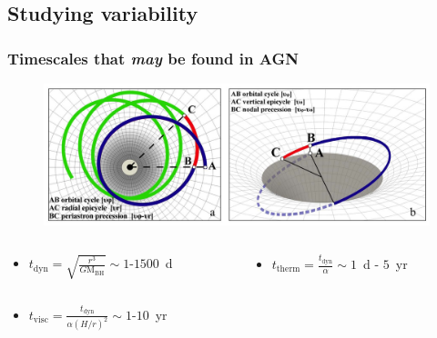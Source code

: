 \documentclass[hyperref={pdfpagelabels=false}]{beamer}
\begin{document}
\subsection{Studying variability}

\begin{frame}
\frametitle{Timescales that \textit{may} be found in AGN}
  \begin{figure}
    \includegraphics[scale=0.55]{images/BelloniStella14_KerrOrbits.jpg}
  \end{figure}
  \centering
  {\tiny \citet{BelloniAccretion}}
  \begin{columns}
    \begin{column}{0.6\textwidth}
      \begin{itemize}
        \item $t_{\mathrm{dyn}} = \sqrt{\frac{r^{3}}{G \mathrm{M}_{\mathrm{BH}}}} \sim 1$-$1500$~d
      \end{itemize}
    \end{column}
    \begin{column}{0.4\textwidth}
      \begin{itemize}
        \item $t_{\mathrm{therm}} = \frac{t_{\mathrm{dyn}}}{\alpha} \sim 1$~d - $5$~yr
      \end{itemize}
    \end{column}
  \end{columns}
  \begin{itemize}
    \centering
    \vspace{5mm}
    \item $t_{\mathrm{visc}} = \frac{t_{\mathrm{dyn}}}{\alpha(H/r)^{2}} \sim 1$-$10$~yr
  \end{itemize}
\end{frame}
\end{document}
